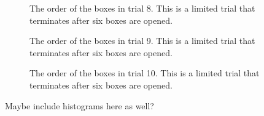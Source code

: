 \begin{figure}
    \centering
    \scalebox{0.8}{}
    \caption[Order of boxes in trial 8]{The order of the boxes in trial 8. This is a limited trial that terminates after six boxes are opened.}
    \label{fig:trial8_order_appendix}
\end{figure}

\begin{figure}
    \centering
    \scalebox{0.8}{}
    \caption[Order of boxes in trial 9]{The order of the boxes in trial 9. This is a limited trial that terminates after six boxes are opened.}
    \label{fig:trial9_order}
\end{figure}

\begin{figure}
    \centering
    \scalebox{0.8}{}
    \caption[Order of boxes in trial 10]{The order of the boxes in trial 10. This is a limited trial that terminates after six boxes are opened.}
    \label{fig:trial10_order}
\end{figure}

Maybe include histograms here as well?